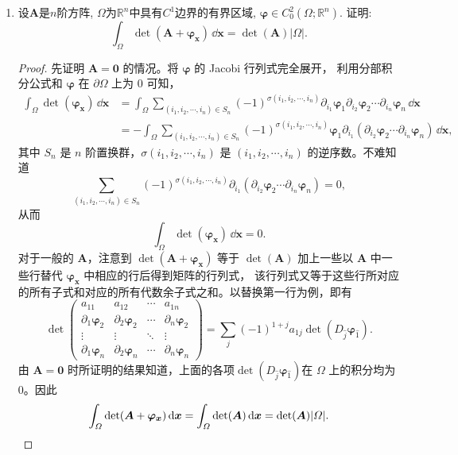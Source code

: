 \begin{quizb}
\begin{enumerate}
\item 设\(\boldsymbol{A}\)是\(n\)阶方阵, 
\(\varOmega\)为\(\mathbb{R}^n\)中具有\(C^1\)边界的有界区域, 
\(\boldsymbol{\varphi}\in C^2_0(\varOmega;\mathbb{R}^n)\). 证明: 
\[\int_{\varOmega}\det(\boldsymbol{A}+\boldsymbol{\varphi_x})\,\dd\boldsymbol{x}
=\det(\boldsymbol{A})|\varOmega|.\]
\begin{proof}
先证明 $\boldsymbol{A}=\boldsymbol{0}$ 的情况。将 $\boldsymbol{\varphi}$ 的 Jacobi 行列式完全展开，
利用分部积分公式和 $\boldsymbol{\varphi}$ 在 $\partial \varOmega$ 上为 $0$ 可知，
\begin{align*}
\int_{\varOmega} \det(\boldsymbol{\varphi}_{\boldsymbol{x}}) \,\dd \boldsymbol{x} 
& =\int_{\varOmega} \sum_{(i_1, i_2, \cdots, i_n) \in S_n}(-1)^{\sigma(i_1, i_2, \cdots, i_n)} \partial_{i_1} \boldsymbol{\varphi}_1 \partial_{i_2} \boldsymbol{\varphi}_2 \cdots \partial_{i_n} \boldsymbol{\varphi}_n \,\dd \boldsymbol{x} \\
& =-\int_{\varOmega} \sum_{(i_1, i_2, \cdots, i_n) \in S_n}(-1)^{\sigma(i_1, i_2, \cdots, i_n)} \boldsymbol{\varphi}_1 \partial_{i_1}(\partial_{i_2} \boldsymbol{\varphi}_2 \cdots \partial_{i_n} \boldsymbol{\varphi}_n) \,\dd \boldsymbol{x},
\end{align*}
其中 $S_n$ 是 $n$ 阶置换群，$\sigma(i_1, i_2, \cdots, i_n)$ 是 $(i_1, i_2, \cdots, i_n)$ 的逆序数。不难知道
\[\sum_{(i_1, i_2, \cdots, i_n) \in S_n}(-1)^{\sigma(i_1, i_2, \cdots, i_n)} \partial_{i_1}(\partial_{i_2} \boldsymbol{\varphi}_2 \cdots \partial_{i_n} \boldsymbol{\varphi}_n)=0,\]
从而
\[\int_{\varOmega} \det(\boldsymbol{\varphi}_{\boldsymbol{x}}) \,\dd \boldsymbol{x}=0.\]
对于一般的 $\boldsymbol{A}$，注意到 $\det(\boldsymbol{A}+\boldsymbol{\varphi_{x}})$ 等于 $\det(\boldsymbol{A})$ 
加上一些以 $\boldsymbol{A}$ 中一些行替代 $\boldsymbol{\varphi_{x}}$ 中相应的行后得到矩阵的行列式，
该行列式又等于这些行所对应的所有子式和对应的所有代数余子式之和。以替换第一行为例，即有
\[\det\begin{pmatrix}
a_{11} & a_{12} & \cdots & a_{1 n} \\
\partial_1 \boldsymbol{\varphi}_2 & \partial_2 \boldsymbol{\varphi}_2 & \cdots & \partial_n \boldsymbol{\varphi}_2 \\
\vdots & \vdots & \ddots & \vdots \\
\partial_1 \boldsymbol{\varphi}_n & \partial_2 \boldsymbol{\varphi}_n & \cdots & \partial_n \boldsymbol{\varphi}_n
\end{pmatrix}=\sum_j(-1)^{1+j} a_{1j} \det(D_{\hat{j}} \boldsymbol{\varphi}_{\hat{1}}).\]
由 $\boldsymbol{A}=\boldsymbol{0}$ 时所证明的结果知道，上面的各项$\det(D_{\hat{j}} \boldsymbol{\varphi}_{\hat{1}})$在 $\varOmega$ 上的积分均为 $0$。因此
\[\int_{\varOmega} \det(\boldsymbol{A}+\boldsymbol{\varphi_{x}}) \,\mathrm{d} \boldsymbol{x}
=\int_{\varOmega} \det(\boldsymbol{A}) \,\mathrm{d} \boldsymbol{x}=\det(\boldsymbol{A})|\varOmega|.\qedhere\]
\end{proof}


\end{enumerate}
\end{quizb}
